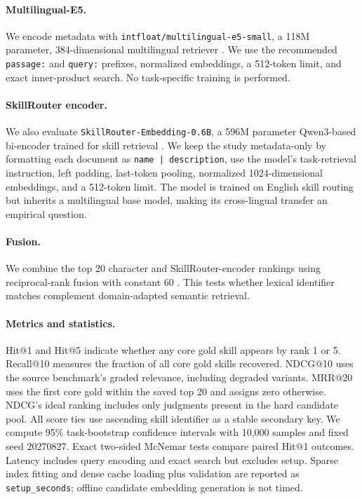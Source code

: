 \documentclass[letterpaper]{article}
\begin{document}
\paragraph{Multilingual-E5.}
We encode metadata with \texttt{intfloat/multilingual-e5-small}, a 118M
parameter, 384-dimensional multilingual retriever
\cite{wang2024multilinguale5}.  We use the recommended \texttt{passage:} and
\texttt{query:} prefixes, normalized embeddings, a 512-token limit, and exact
inner-product search.  No task-specific training is performed.

\paragraph{SkillRouter encoder.}
We also evaluate \texttt{SkillRouter-Embedding-0.6B}, a 596M parameter
Qwen3-based bi-encoder trained for skill retrieval
\cite{zheng2026skillrouter}.  We keep the study metadata-only by formatting
each document as \texttt{name | description}, use the model's task-retrieval
instruction, left padding, last-token pooling, normalized 1024-dimensional
embeddings, and a 512-token limit.  The model is trained on English skill
routing but inherits a multilingual base model, making its cross-lingual
transfer an empirical question.

\paragraph{Fusion.}
We combine the top 20 character and SkillRouter-encoder rankings using
reciprocal-rank fusion with constant 60 \cite{cormack2009rrf}.  This tests
whether lexical identifier matches complement domain-adapted semantic
retrieval.

\paragraph{Metrics and statistics.}
Hit@1 and Hit@5 indicate whether any core gold skill appears by rank 1 or 5.
Recall@10 measures the fraction of all core gold skills recovered.  NDCG@10
uses the source benchmark's graded relevance, including degraded variants.
MRR@20 uses the first core gold within the saved top 20 and assigns zero
otherwise.  NDCG's ideal ranking includes only judgments present in the hard
candidate pool.  All score ties use ascending skill identifier as a stable
secondary key.  We compute 95\% task-bootstrap confidence intervals with
10,000 samples and fixed seed 20270827.  Exact two-sided McNemar tests compare
paired Hit@1 outcomes.  Latency includes query encoding and exact search but
excludes setup.  Sparse index fitting and dense cache loading plus validation
are reported as \texttt{setup\_seconds}; offline candidate embedding generation
is not timed.
\end{document}

